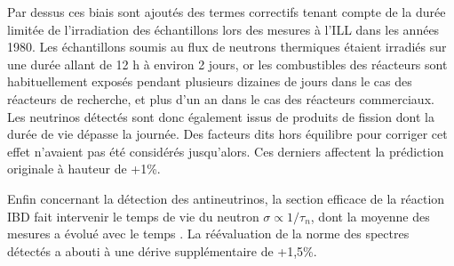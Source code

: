 Par dessus ces biais sont ajoutés des termes correctifs tenant compte de la durée limitée de l'irradiation des échantillons lors des mesures à l'ILL dans les années 1980. Les échantillons soumis au flux de neutrons thermiques étaient irradiés sur une durée allant de 12 h à environ 2 jours, or les combustibles des réacteurs sont habituellement exposés pendant plusieurs dizaines de jours dans le cas des réacteurs de recherche, et plus d'un an dans le cas des réacteurs commerciaux. Les neutrinos détectés sont donc également issus de produits de fission dont la durée de vie dépasse la journée. Des facteurs dits \og hors équilibre \fg{} pour corriger cet effet n'avaient pas été considérés jusqu'alors. Ces derniers affectent la prédiction originale à hauteur de +1\%.\\


Enfin concernant la détection des antineutrinos, la section efficace de la réaction IBD fait intervenir le temps de vie du neutron $\sigma \propto 1/\tau_n$, dont la moyenne des mesures a évolué avec le temps \cite{Tanabashi:2018oca}. La réévaluation de la norme des spectres détectés a abouti à une dérive supplémentaire de +1,5\%.\\

